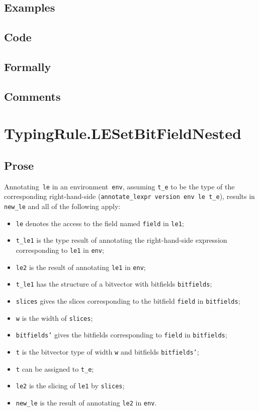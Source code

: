 \documentclass{book}
\begin{document}
  \subsection{Examples}

  \subsection{Code}

  \subsection{Formally}

  \subsection{Comments}

\section{TypingRule.LESetBitFieldNested \label{sec:TypingRule.LESetBitFieldNested}}

    \subsection{Prose}
   Annotating~\texttt{le} in an environment~\texttt{env}, assuming
\texttt{t\_e} to be the type of the corresponding right-hand-side
(\texttt{annotate\_lexpr version env le t\_e}), results in \texttt{new\_le} and
all of the following apply:
   \begin{itemize}
   \item \texttt{le} denotes the access to the field named \texttt{field} in \texttt{le1};
   \item \texttt{t\_le1} is the type result of annotating the right-hand-side expression corresponding to \texttt{le1} in \texttt{env};
   \item \texttt{le2} is the result of annotating \texttt{le1} in \texttt{env};
   \item \texttt{t\_le1} has the structure of a bitvector with bitfields \texttt{bitfields};
   \item \texttt{slices} gives the slices corresponding to the bitfield \texttt{field} in
      \texttt{bitfields};
   \item \texttt{w} is the width of \texttt{slices};
   \item \texttt{bitfields'} gives the bitfields corresponding to \texttt{field} in \texttt{bitfields};
   \item \texttt{t} is the bitvector type of width \texttt{w} and bitfields \texttt{bitfields'};
   \item \texttt{t} can be assigned to \texttt{t\_e};
   \item \texttt{le2} is the slicing of \texttt{le1} by \texttt{slices};
   \item \texttt{new\_le} is the result of annotating \texttt{le2} in \texttt{env}.
   \end{itemize}
\end{document}
